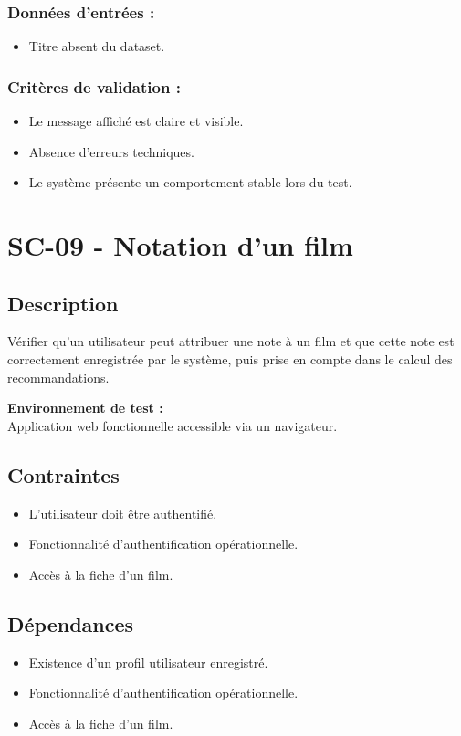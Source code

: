 \documentclass[a4paper,12pt]{report}
\begin{document}
\subsubsection{Données d'entrées :}
\begin{itemize}
    \item Titre absent du dataset.
\end{itemize}


\subsubsection{Critères de validation :}
\begin{itemize}
    \item Le message affiché est claire et visible.
    \item Absence d'erreurs techniques.
    \item Le système présente un comportement stable lors du test.
\end{itemize}
\newpage

\section{SC-09 - Notation d'un film}
\label{Fi2}
\subsection*{Description}
Vérifier qu’un utilisateur peut attribuer une note à un film et que cette note est correctement enregistrée par le système, puis prise en compte dans le calcul des recommandations.

\textbf{Environnement de test :}\\
Application web fonctionnelle accessible via un navigateur.
\subsection*{Contraintes}
\begin{itemize}
    \item L’utilisateur doit être authentifié.
    \item Fonctionnalité d’authentification opérationnelle.
    \item Accès à la fiche d’un film.
\end{itemize}

\subsection*{Dépendances }
\begin{itemize}
    \item Existence d’un profil utilisateur enregistré.
    \item Fonctionnalité d’authentification opérationnelle.
    \item Accès à la fiche d’un film.
\end{itemize}
\end{document}
